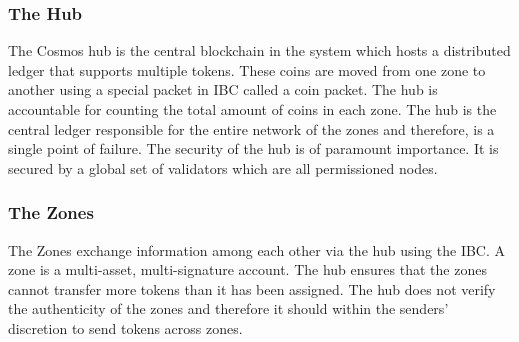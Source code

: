 \documentclass[a4paper,twoside,phd]{BYUPhys}
\begin{document}
\subsubsection{The Hub}
The Cosmos hub is the central blockchain in the system which hosts a distributed ledger that supports multiple tokens\cite{Kwon2018ALedgers}. These coins are moved from one zone to another using a special packet in IBC called a coin packet\cite{Kwon2018ALedgers}. The hub is accountable for counting the total amount of coins in each zone. The hub is the central ledger responsible for the entire network of the zones and therefore, is a single point of failure. The security of the hub is of paramount importance. It is secured by a global set of validators which are all permissioned nodes\cite{Kwon2018ALedgers}.
\subsubsection{The Zones}
The Zones exchange information among each other via the hub using the IBC\cite{Kwon2018ALedgers}. A zone is a multi-asset, multi-signature account\cite{Kwon2018ALedgers}. The hub ensures that the zones cannot transfer more tokens than it has been assigned. The hub does not verify the authenticity of the zones and therefore it should within the senders' discretion to send tokens across zones\cite{Kwon2018ALedgers}. 
\end{document}
